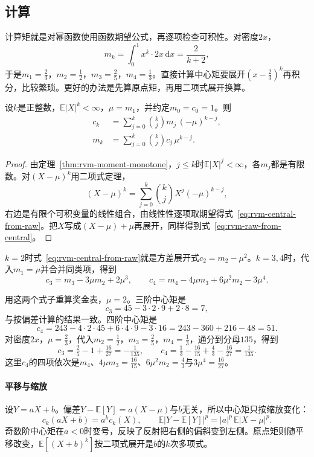 \subsection{计算}
\label{sec:rvm-moment-computation}

计算矩就是对幂函数使用函数期望公式，再逐项检查可积性。对密度$2x$，
\[
 m_k=\int_0^1x^{k}\cdot2x\,\mathrm{d}x=\frac{2}{k+2},
\]
于是$m_1=\tfrac23$，$m_2=\tfrac12$，$m_3=\tfrac25$，$m_4=\tfrac13$。直接计算中心矩要展开$(x-\tfrac23)^{k}$再积分，比较繁琐。更好的办法是先算原点矩，再用二项式展开换算。

\begin{theorem}[原点矩与中心矩的换算]
\label{thm:rvm-moment-conversion}
设$k$是正整数，$\mathbb{E}\lvert X\rvert^{k}<\infty$，$\mu=m_1$，并约定$m_0=c_0=1$。则
\begin{align}
 c_k&=\sum_{j=0}^{k}\binom{k}{j}m_j\,(-\mu)^{k-j},
 \label{eq:rvm-central-from-raw}\\
 m_k&=\sum_{j=0}^{k}\binom{k}{j}c_j\,\mu^{k-j}.
 \label{eq:rvm-raw-from-central}
\end{align}
\end{theorem}

\begin{proof}
由定理~\ref{thm:rvm-moment-monotone}，$j\leq k$时$\mathbb{E}\lvert X\rvert^{j}<\infty$，各$m_j$都是有限数。对$(X-\mu)^{k}$用二项式定理，
\[
 (X-\mu)^{k}=\sum_{j=0}^{k}\binom{k}{j}X^{j}(-\mu)^{k-j},
\]
右边是有限个可积变量的线性组合，由线性性逐项取期望得式~\eqref{eq:rvm-central-from-raw}。把$X$写成$(X-\mu)+\mu$再展开，同样得到式~\eqref{eq:rvm-raw-from-central}。
\end{proof}

$k=2$时式~\eqref{eq:rvm-central-from-raw}就是方差展开式$c_2=m_2-\mu^{2}$。$k=3,4$时，代入$m_1=\mu$并合并同类项，得到
\[
 c_3=m_3-3\mu m_2+2\mu^{3},\qquad c_4=m_4-4\mu m_3+6\mu^{2}m_2-3\mu^{4} .
\]

用这两个式子重算奖金表，$\mu=2$。三阶中心矩是
\[
 c_3=45-3\cdot2\cdot9+2\cdot8=7,
\]
与按偏差计算的结果一致。四阶中心矩是
\[
 c_4=243-4\cdot2\cdot45+6\cdot4\cdot9-3\cdot16=243-360+216-48=51 .
\]
对密度$2x$，$\mu=\tfrac23$，代入$m_2=\tfrac12$，$m_3=\tfrac25$，$m_4=\tfrac13$，通分到分母$135$，得到
\[
 c_3=\tfrac25-1+\tfrac{16}{27}=-\tfrac{1}{135},\qquad
 c_4=\tfrac13-\tfrac{16}{15}+\tfrac{4}{3}-\tfrac{16}{27}=\tfrac{1}{135} .
\]
这里$c_4$的四项依次是$m_4$、$4\mu m_3=\tfrac{16}{15}$、$6\mu^{2}m_2=\tfrac43$与$3\mu^{4}=\tfrac{16}{27}$。

\paragraph{平移与缩放}
设$Y=aX+b$。偏差$Y-\mathbb{E}[Y]=a(X-\mu)$与$b$无关，所以中心矩只按缩放变化：
\begin{equation}
 c_k(aX+b)=a^{k}c_k(X),\qquad \mathbb{E}\bigl\lvert Y-\mathbb{E}[Y]\bigr\rvert^{p}=\lvert a\rvert^{p}\,\mathbb{E}\lvert X-\mu\rvert^{p} .
 \label{eq:rvm-central-affine}
\end{equation}
奇数阶中心矩在$a<0$时变号，反映了反射把右侧的偏斜变到左侧。原点矩则随平移改变，$\mathbb{E}[(X+b)^{k}]$按二项式展开是$b$的$k$次多项式。

